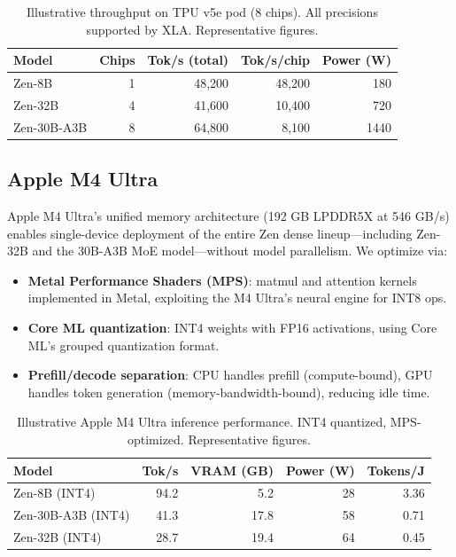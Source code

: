 \documentclass[11pt,a4paper]{article}
\begin{document}
\begin{table}[H]
\centering
\caption{Illustrative throughput on TPU v5e pod (8 chips). All precisions supported by XLA. Representative figures.}
\begin{tabular}{lrrrr}
\toprule
\textbf{Model} & \textbf{Chips} & \textbf{Tok/s (total)} & \textbf{Tok/s/chip} & \textbf{Power (W)} \\
\midrule
Zen-8B      & 1 & 48,200 & 48,200 & 180 \\
Zen-32B     & 4 & 41,600 & 10,400 & 720 \\
Zen-30B-A3B & 8 & 64,800 & 8,100  & 1440 \\
\bottomrule
\end{tabular}
\label{tab:tpu}
\end{table}

\subsection{Apple M4 Ultra}

Apple M4 Ultra's unified memory architecture (192 GB LPDDR5X at 546 GB/s) enables
single-device deployment of the entire Zen dense lineup---including Zen-32B and the
30B-A3B MoE model---without model parallelism. We optimize via:

\begin{itemize}
    \item \textbf{Metal Performance Shaders (MPS)}: matmul and attention kernels
          implemented in Metal, exploiting the M4 Ultra's neural engine for INT8 ops.
    \item \textbf{Core ML quantization}: INT4 weights with FP16 activations, using
          Core ML's grouped quantization format.
    \item \textbf{Prefill/decode separation}: CPU handles prefill (compute-bound),
          GPU handles token generation (memory-bandwidth-bound), reducing idle time.
\end{itemize}

\begin{table}[H]
\centering
\caption{Illustrative Apple M4 Ultra inference performance. INT4 quantized, MPS-optimized. Representative figures.}
\begin{tabular}{lrrrr}
\toprule
\textbf{Model} & \textbf{Tok/s} & \textbf{VRAM (GB)} & \textbf{Power (W)} & \textbf{Tokens/J} \\
\midrule
Zen-8B  (INT4)      & 94.2  & 5.2  & 28  & 3.36 \\
Zen-30B-A3B (INT4)  & 41.3  & 17.8 & 58  & 0.71 \\
Zen-32B (INT4)      & 28.7  & 19.4 & 64  & 0.45 \\
\bottomrule
\end{tabular}
\label{tab:m4}
\end{table}
\end{document}
